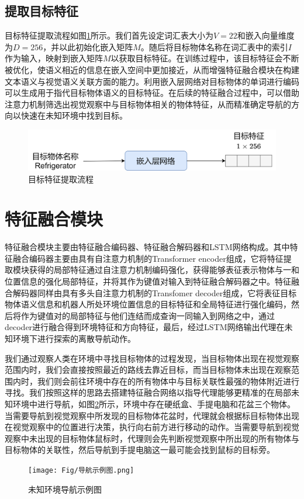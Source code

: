\subsection{提取目标特征}
目标特征提取流程如图\ref{目标特征提取}所示。我们首先设定词汇表大小为$V = 22$和嵌入向量维度为$D = 256$，并以此初始化嵌入矩阵$M$。随后将目标物体名称在词汇表中的索引$I$作为输入，映射到嵌入矩阵$M$以获取目标特征。在训练过程中，该目标特征会不断被优化，使语义相近的信息在嵌入空间中更加接近，从而增强特征融合模块在构建文本语义与视觉语义关联方面的能力。利用嵌入层网络对目标物体的单词进行编码可以生成用于指代目标物体语义的目标特征。在后续的特征融合过程中，可以借助注意力机制筛选出视觉观察中与目标物体相关的物体特征，从而精准确定导航的方向以快速在未知环境中找到目标。
\begin{figure}[htbp]
    \centering
    \includegraphics[scale=0.10]{Fig/目标特征提取.png}
    \caption{\label{目标特征提取}目标特征提取流程}
\end{figure}



\section{特征融合模块}
特征融合模块主要由特征融合编码器、特征融合解码器和LSTM网络构成。其中特征融合编码器主要由具有自注意力机制的Transformer encoder组成，它将特征提取模块获得的局部特征通过自注意力机制编码强化，获得能够表征表示物体与一和位置信息的强化局部特征，并将其作为键值对输入到特征融合解码器之中。特征融合解码器同样由具有多头自注意力机制的Transfomer decoder组成，它将表征目标物体语义信息和机器人所处环境位置信息的目标特征和全局特征进行强化编码，然后将作为键值对的局部特征与他们连结而成查询一同输入到网络之中，通过decoder进行融合得到环境特征和方向特征，最后，经过LSTM网络输出代理在未知环境下进行探索的离散导航动作。

我们通过观察人类在环境中寻找目标物体的过程发现，当目标物体出现在视觉观察范围内时，我们会直接按照最近的路线去靠近目标，而当目标物体未出现在观察范围内时，我们则会前往环境中存在的所有物体中与目标关联性最强的物体附近进行寻找。我们按照这样的思路去搭建特征融合网络以指导代理能够更精准的在局部未知环境中进行导航，如图\ref{未知环境导航示例图}所示，环境中存在硬纸盒、手提电脑和花盆三个物体。当需要导航到视觉观察中所发现的目标物体花盆时，代理就会根据标目标物体出现在视觉观察中的位置进行决策，执行向右前方进行移动的动作。当需要导航到视觉观察中未出现的目标物体鼠标时，代理则会先判断视觉观察中所出现的所有物体与目标物体的关联性，然后导航到手提电脑这一最可能会找到鼠标的目标旁。
\begin{figure}[htbp]
    \centering
    \texttt{[image: Fig/导航示例图.png]}
    \caption{\label{未知环境导航示例图}未知环境导航示例图}
\end{figure}

